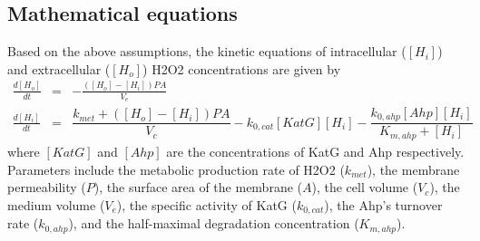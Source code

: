 \documentclass[10pt]{article}
\begin{document}
\subsection{Mathematical equations}
Based on the above assumptions, the kinetic equations of intracellular ($[H_{i}]$) and extracellular ($[H_{o}]$) H2O2 concentrations are given by
\begin{eqnarray}
\frac{d[H_o]}{dt} &=& -\frac{([H_o]-[H_i])PA}{V_e} \\
\frac{d[H_i]}{dt} &=& \dfrac{k_{met}+([H_o]-[H_i])PA}{V_c} -k_{0,cat}[KatG][H_i] - \dfrac{k_{0,ahp}[Ahp][H_i]}{K_{m,ahp}+[H_i]}\label{eq:dhidt}
\end{eqnarray}
where $[KatG]$ and $[Ahp]$ are the concentrations of KatG and Ahp respectively. Parameters include the metabolic production rate of H2O2 ($k_{met}$), the membrane permeability ($P$), the surface area of the membrane ($A$), the cell volume ($V_c$), the medium volume ($V_e$), the specific activity of KatG ($k_{0,cat}$), the Ahp's turnover rate ($k_{0,ahp}$), and the half-maximal degradation concentration ($K_{m,ahp}$). 
\end{document}
